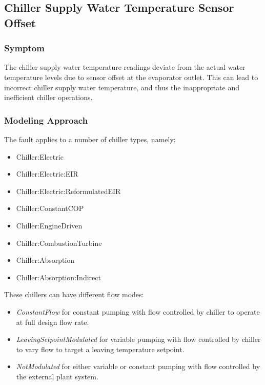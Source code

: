 \subsection{Chiller Supply Water Temperature Sensor Offset}\label{chiller-supply-water-temperature-sensor-offset}

\subsubsection{Symptom}

The chiller supply water temperature readings deviate from the actual water temperature levels due to sensor offset at the evaporator outlet. This can lead to incorrect chiller supply water temperature, and thus the inappropriate and inefficient chiller operations.

\subsubsection{Modeling Approach}

The fault applies to a number of chiller types, namely:

\begin{itemize}
\tightlist
\item
  Chiller:Electric
\item
  Chiller:Electric:EIR
\item
  Chiller:Electric:ReformulatedEIR
\item
  Chiller:ConstantCOP
\item
  Chiller:EngineDriven
\item
  Chiller:CombustionTurbine
\item
  Chiller:Absorption
\item
  Chiller:Absorption:Indirect
\end{itemize}

These chillers can have different flow modes:

\begin{itemize}
\tightlist
\item
  \emph{ConstantFlow} for constant pumping with flow controlled by chiller to operate at full design flow rate.
\item
  \emph{LeavingSetpointModulated} for variable pumping with flow controlled by chiller to vary flow to target a leaving temperature setpoint.
\item
  \emph{NotModulated} for either variable or constant pumping with flow controlled by the external plant system.
\end{itemize}

